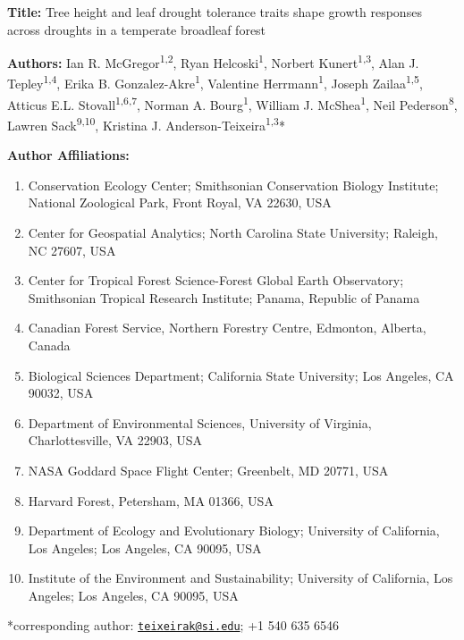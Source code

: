 \documentclass[
]{article}
\author{}
\date{\vspace{-2.5em}}
\providecommand{\tightlist}{%
  \setlength{\itemsep}{0pt}\setlength{\parskip}{0pt}}
\begin{document}
\raggedright

\textbf{Title:} Tree height and leaf drought tolerance traits shape
growth responses across droughts in a temperate broadleaf forest

\textbf{Authors:} Ian R. McGregor\textsuperscript{1,2}, Ryan
Helcoski\textsuperscript{1}, Norbert Kunert\textsuperscript{1,3}, Alan
J. Tepley\textsuperscript{1,4}, Erika B.
Gonzalez-Akre\textsuperscript{1}, Valentine Herrmann\textsuperscript{1},
Joseph Zailaa\textsuperscript{1,5}, Atticus E.L.
Stovall\textsuperscript{1,6,7}, Norman A. Bourg\textsuperscript{1},
William J. McShea\textsuperscript{1}, Neil Pederson\textsuperscript{8},
Lawren Sack\textsuperscript{9,10}, Kristina J.
Anderson-Teixeira\textsuperscript{1,3}*

\textbf{Author Affiliations:}

\begin{enumerate}
\def\labelenumi{\arabic{enumi}.}
\tightlist
\item
  Conservation Ecology Center; Smithsonian Conservation Biology
  Institute; National Zoological Park, Front Royal, VA 22630, USA
\item
  Center for Geospatial Analytics; North Carolina State University;
  Raleigh, NC 27607, USA
\item
  Center for Tropical Forest Science-Forest Global Earth Observatory;
  Smithsonian Tropical Research Institute; Panama, Republic of Panama
\item
  Canadian Forest Service, Northern Forestry Centre, Edmonton, Alberta,
  Canada
\item
  Biological Sciences Department; California State University; Los
  Angeles, CA 90032, USA
\item
  Department of Environmental Sciences, University of Virginia,
  Charlottesville, VA 22903, USA
\item
  NASA Goddard Space Flight Center; Greenbelt, MD 20771, USA
\item
  Harvard Forest, Petersham, MA 01366, USA
\item
  Department of Ecology and Evolutionary Biology; University of
  California, Los Angeles; Los Angeles, CA 90095, USA
\item
  Institute of the Environment and Sustainability; University of
  California, Los Angeles; Los Angeles, CA 90095, USA
\end{enumerate}

*corresponding author:
\href{mailto:teixeirak@si.edu}{\nolinkurl{teixeirak@si.edu}}; +1 540 635
6546
\end{document}
